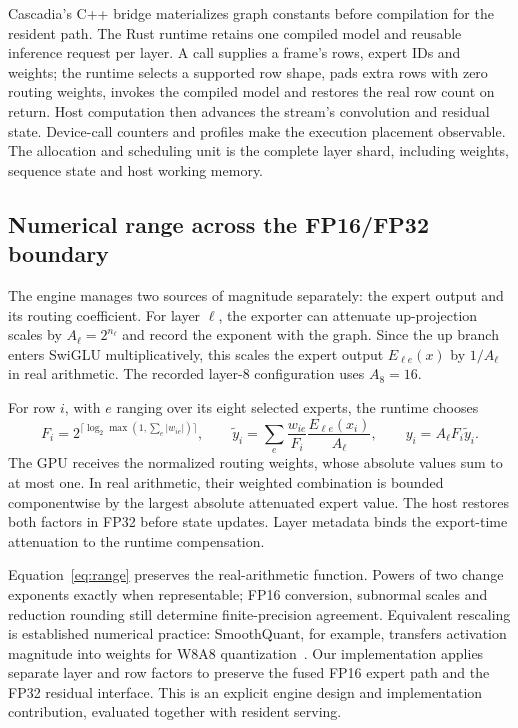 \documentclass[11pt]{article}
\begin{document}
Cascadia's C++ bridge materializes graph constants before compilation for the resident path. The Rust runtime retains one compiled model and reusable inference request per layer. A call supplies a frame's rows, expert IDs and weights; the runtime selects a supported row shape, pads extra rows with zero routing weights, invokes the compiled model and restores the real row count on return. Host computation then advances the stream's convolution and residual state. Device-call counters and profiles make the execution placement observable. The allocation and scheduling unit is the complete layer shard, including weights, sequence state and host working memory.

\subsection{Numerical range across the FP16/FP32 boundary}
The engine manages two sources of magnitude separately: the expert output and its routing coefficient. For layer $\ell$, the exporter can attenuate up-projection scales by $A_\ell=2^{n_\ell}$ and record the exponent with the graph. Since the up branch enters SwiGLU multiplicatively, this scales the expert output $E_{\ell e}(x)$ by $1/A_\ell$ in real arithmetic. The recorded layer-8 configuration uses $A_8=16$.

For row $i$, with $e$ ranging over its eight selected experts, the runtime chooses
\begin{equation}
 F_i=2^{\lceil\log_2\max(1,\sum_e |w_{ie}|)\rceil},\qquad
 \widetilde y_i=\sum_e\frac{w_{ie}}{F_i}\frac{E_{\ell e}(x_i)}{A_\ell},\qquad
 y_i=A_\ell F_i\widetilde y_i.
 \label{eq:range}
\end{equation}
The GPU receives the normalized routing weights, whose absolute values sum to at most one. In real arithmetic, their weighted combination is bounded componentwise by the largest absolute attenuated expert value. The host restores both factors in FP32 before state updates. Layer metadata binds the export-time attenuation to the runtime compensation.

Equation~\ref{eq:range} preserves the real-arithmetic function. Powers of two change exponents exactly when representable; FP16 conversion, subnormal scales and reduction rounding still determine finite-precision agreement. Equivalent rescaling is established numerical practice: SmoothQuant, for example, transfers activation magnitude into weights for W8A8 quantization~\cite{smoothquant}. Our implementation applies separate layer and row factors to preserve the fused FP16 expert path and the FP32 residual interface. This is an explicit engine design and implementation contribution, evaluated together with resident serving.
\end{document}
